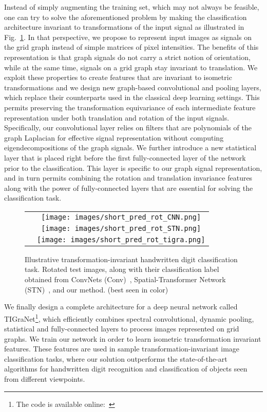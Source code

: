 \documentclass[10pt,journal,compsoc]{IEEEtran}
\begin{document}
	Instead of simply augmenting the training set, which may not always be feasible, one can try to solve the aforementioned problem by making the classification architecture invariant to transformations of the input signal as illustrated in Fig.~\ref{fig:adv}. In that perspective, we propose to represent input images as signals on the grid graph instead of simple matrices of pixel intensities. The benefits of this representation is that graph signals do not carry a strict notion of orientation, while at the same time, signals on a grid graph stay invariant to translation. We exploit these properties to create features that are invariant to isometric transformations and we design new graph-based convolutional and pooling layers, which replace their counterparts used in the classical deep learning settings. This permits preserving the transformation equivariance of each intermediate feature representation under both translation and rotation of the input signals. Specifically, our convolutional layer relies on filters that are polynomials of the graph Laplacian for effective signal representation without computing eigendecompositions of the graph signals. We further introduce a new statistical layer that is placed right before the first fully-connected layer of the network prior to the classification. This layer is specific to our graph signal representation, and in turn permits combining the rotation and translation invariance features along with the power of fully-connected layers that are essential for solving the classification task.
	\begin{figure}
		\centering
		\begin{tabular}{cc}
			\raisebox{0.2cm}{\rotatebox{90}{Conv}} &
			\texttt{[image: images/short\_pred\_rot\_CNN.png]} \\
			\raisebox{0.2cm}{\rotatebox{90}{STN}} &
			\texttt{[image: images/short\_pred\_rot\_STN.png]} \\
			\raisebox{0.cm}{\rotatebox{90}{TIGraNet}} &
			\texttt{[image: images/short\_pred\_rot\_tigra.png]} \\
		\end{tabular}
		\caption{Illustrative transformation-invariant handwritten digit classification task. Rotated test images, along with their classification label obtained from ConvNets (Conv)~\cite{bb:lecun}, Spatial-Transformer Network (STN)~\cite{bb:STN}, and our method. (best seen in color)}
		\label{fig:adv}
	\end{figure}
	We finally design a complete architecture for a deep neural network called TIGraNet\footnote{The code is available online:~}, which efficiently combines spectral convolutional, dynamic pooling, statistical and fully-connected layers to process images represented on grid graphs. We train our network in order to learn isometric transformation invariant features. These features are used in sample transformation-invariant image classification tasks, where our solution outperforms the state-of-the-art algorithms for handwritten digit recognition and classification of objects seen from different viewpoints.
\end{document}
